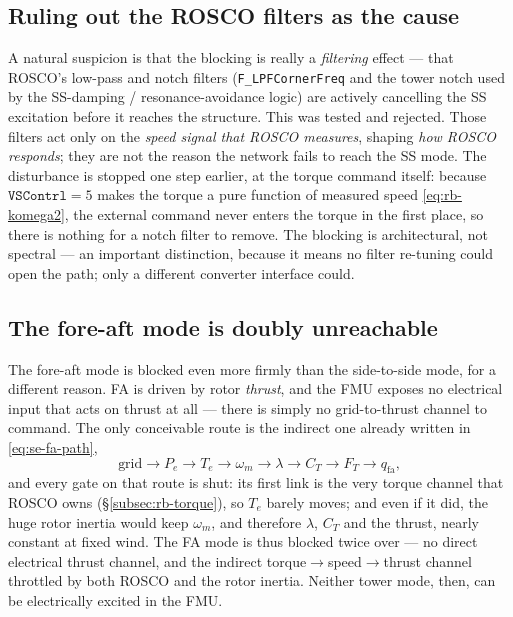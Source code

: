 \subsection{Ruling out the ROSCO filters as the cause}
\label{subsec:rb-filters}

A natural suspicion is that the blocking is really a \emph{filtering} effect ---
that ROSCO's low-pass and notch filters (\texttt{F\_LPFCornerFreq} and the tower
notch used by the SS-damping / resonance-avoidance logic) are actively cancelling
the SS excitation before it reaches the structure. This was tested and rejected.
Those filters act only on the \emph{speed signal that ROSCO measures}, shaping
\emph{how ROSCO responds}; they are not the reason the network fails to reach the
SS mode. The disturbance is stopped one step earlier, at the torque command
itself: because \(\texttt{VSContrl}=5\) makes the torque a pure function of
measured speed \eqref{eq:rb-komega2}, the external command never enters the torque
in the first place, so there is nothing for a notch filter to remove. The blocking
is architectural, not spectral --- an important distinction, because it means no
filter re-tuning could open the path; only a different converter interface could.

\subsection{The fore-aft mode is doubly unreachable}
\label{subsec:rb-foreaft}

The fore-aft mode is blocked even more firmly than the side-to-side mode, for a
different reason. FA is driven by rotor \emph{thrust}, and the FMU exposes no
electrical input that acts on thrust at all --- there is simply no
grid-to-thrust channel to command. The only conceivable route is the indirect one
already written in \eqref{eq:se-fa-path},
\[
  \text{grid}\to P_e\to T_e\to \omega_m\to \lambda\to C_T\to F_T
  \to q_{\mathrm{fa}},
\]
and every gate on that route is shut: its first link is the very torque channel
that ROSCO owns (\S\ref{subsec:rb-torque}), so \(T_e\) barely moves; and even if it
did, the huge rotor inertia would keep \(\omega_m\), and therefore \(\lambda\),
\(C_T\) and the thrust, nearly constant at fixed wind. The FA mode is thus blocked
twice over --- no direct electrical thrust channel, and the indirect
torque\(\to\)speed\(\to\)thrust channel throttled by both ROSCO and the rotor
inertia. Neither tower mode, then, can be electrically excited in the FMU.

